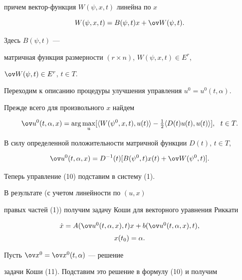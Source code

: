 причем вектор-функция $W(\psi,x,t)$ линейна по $x$


$$


W(\psi,x,t)=B(\psi,t)x+\ov W(\psi,t).


$$


Здесь $B(\psi,t)$ ---


матричная функция размерности $(r\times n)$, $W(\psi,x,t)\in E^r$,


$\ov W(\psi, t)\in E^r$, $t\in T$.





Переходим к описанию процедуры улучшения управления $u^0=u^0(t,\alpha)$.


Прежде всего для произвольного $x$ найдем 


\begin{equation}


\ov u^0(t,\alpha,x)=\arg\max_{u}[\la W(\psi^0,x,t),u(t)\ra-


\tfrac{1}{2}\la D(t)u(t),u(t)\ra],\ \ t\in T.


\end{equation}


В силу определенной положительности матричной функции $D(t)$, $t\in T$,


\begin{equation}


\ov u^0(t,\alpha,x)=D^{-1}(t)[B(\psi^0,t)x(t)+\ov W(\psi^0,t)].


\end{equation}


Теперь управление (10) подставим в систему (1). 


В результате (с учетом линейности по $(u,x)$


правых частей (1)) получим задачу Коши для векторного уравнения Риккати


\begin{equation}


\begin{array}{c} 


\Dot x=A(\ov u^0(t,\alpha,x),t)x+b(\ov u^0(t,\alpha,x),t),\\[2mm]


x(t_0)=\alpha. 


\end{array}


\end{equation}


Пусть $\ov x^0=\ov x^0(t,\alpha)$ --- решение 


задачи Коши (11). Подставим это решение в формулу (10) и получим


